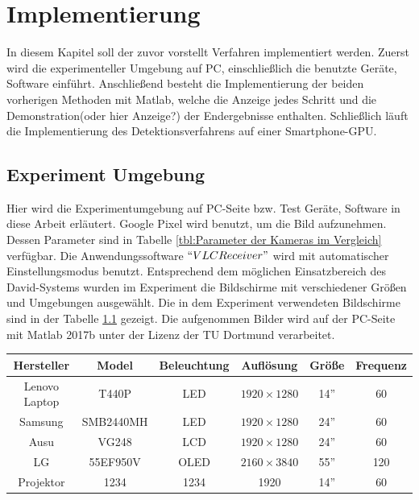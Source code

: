 \chapter{Implementierung} \label{cha:Implementierung}

In diesem Kapitel soll der zuvor vorstellt Verfahren implementiert werden. Zuerst wird die experimenteller Umgebung auf PC, einschließlich die benutzte Geräte, Software einführt. Anschließend besteht die Implementierung der beiden vorherigen Methoden mit Matlab, welche die Anzeige jedes Schritt und die Demonstration(oder hier Anzeige?) der Endergebnisse enthalten. Schließlich läuft die Implementierung des Detektionsverfahrens auf einer Smartphone-GPU.

\section{Experiment Umgebung}

Hier wird die Experimentumgebung auf PC-Seite bzw. Test Geräte, Software in diese Arbeit erläutert. Google Pixel wird benutzt, um die Bild aufzunehmen. Dessen Parameter sind in Tabelle \ref{tbl:Parameter der Kameras im Vergleich} verfügbar. Die Anwendungssoftware $ ``VLCReceiver" $ wird mit automatischer Einstellungsmodus benutzt. Entsprechend dem möglichen Einsatzbereich des David-Systems wurden im Experiment die Bildschirme mit verschiedener Größen und Umgebungen ausgewählt. Die in dem Experiment verwendeten Bildschirme sind in der Tabelle \ref{tbl:Verwendeter Bildschirm} gezeigt. Die aufgenommen Bilder wird auf der PC-Seite mit Matlab 2017b unter der Lizenz der TU Dortmund verarbeitet.

\begin{table}[htb]
	\label{tbl:Verwendeter Bildschirm}
	\footnotesize
	\centering
	\begin{tabular}{|c|c|c|c|c|c|}
	\toprule
	\textbf{Hersteller} & \textbf{Model} & \textbf{Beleuchtung} & \textbf{Auflösung} & \textbf{Größe}	& \textbf{Frequenz}\\
	\midrule
	Lenovo Laptop & T440P & LED & $ 1920 \times 1280$ & 14'' & 60 \\
	Samsung 	  & SMB2440MH   & LED & $ 1920 \times 1280$ & 24'' & 60 \\
	Ausu  		  & VG248   & LCD & $ 1920 \times 1280$ & 24'' & 60 \\
	LG  		  & 55EF950V & OLED & $ 2160 \times 3840$ & 55'' & 120 \\
	 Projektor & 1234 & 1234 & 1920 & 14'' & 60 \\
	
	\bottomrule
	\end{tabular}
\end{table} 

